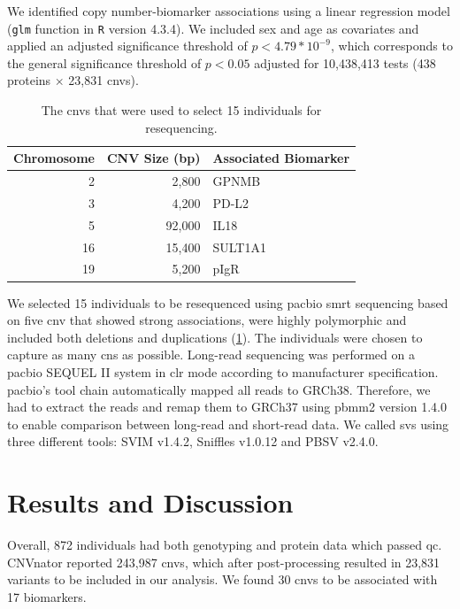 \documentclass[draft, twoside=false]{scrbook}
\begin{document}
We identified copy number-biomarker associations using a linear regression model (\texttt{glm} function in \texttt{R} version 4.3.4).
We included sex and age as covariates and applied an adjusted significance threshold of \(p < 4.79*10^{-9}\), which corresponds to the general significance threshold of $p < 0.05$ adjusted for 10,438,413 tests (438 proteins $\times$ 23,831 \glspl{cnv}).

\begin{table}
    \centering
    \begin{tabular}{r r l}
        \toprule
        \textbf{Chromosome} & \textbf{CNV Size (bp)} & \textbf{Associated Biomarker} \\
        \midrule
        2 & 2,800 & GPNMB \\
        3 & 4,200 & PD-L2 \\
        5 & 92,000 & IL18 \\
        16 & 15,400 & SULT1A1 \\
        19 & 5,200 & pIgR \\
        \bottomrule
    \end{tabular}
    \caption{The \glspl{cnv} that were used to select 15 individuals for resequencing.}
    \label{tab:primecnvs}
\end{table}

We selected 15 individuals to be resequenced using \gls{pacbio} \gls{smrt} sequencing based on five \gls{cnv} that showed strong associations, were highly polymorphic and included both deletions and duplications (\cref{tab:primecnvs}).
The individuals were chosen to capture as many \glspl{cn} as possible.
Long-read sequencing was performed on a \gls{pacbio} SEQUEL II system in \gls{clr} mode according to manufacturer specification.
\gls{pacbio}'s tool chain automatically mapped all reads to GRCh38.
Therefore, we had to extract the reads and remap them to GRCh37 using \textsf{pbmm2} version 1.4.0 to enable comparison between long-read and short-read data.
We called \glspl{sv} using three different tools: \textsf{SVIM} v1.4.2, \textsf{Sniffles} v1.0.12 and \textsf{PBSV} v2.4.0.

\section{Results and Discussion}
Overall, 872 individuals had both genotyping and protein data which passed \gls{qc}.
\textsf{CNVnator} reported 243,987 \glspl{cnv}, which after post-processing resulted in 23,831 variants to be included in our analysis.
We found 30 \glspl{cnv} to be associated with 17 biomarkers.
\end{document}
